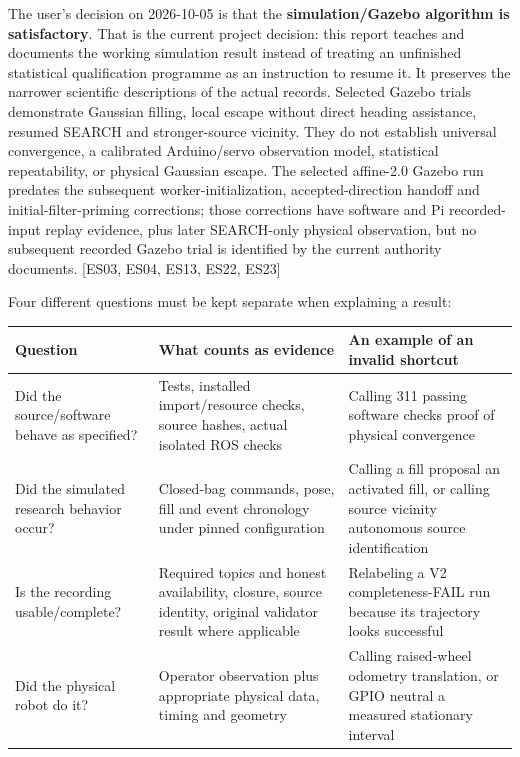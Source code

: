\documentclass[
  10pt,
  letterpaper,
]{article}
\newcounter{none} %
\begin{document}
The user's decision on 2026-10-05 is that the \textbf{simulation/Gazebo
algorithm is satisfactory}. That is the current project decision: this
report teaches and documents the working simulation result instead of
treating an unfinished statistical qualification programme as an
instruction to resume it. It preserves the narrower scientific
descriptions of the actual records. Selected Gazebo trials demonstrate
Gaussian filling, local escape without direct heading assistance,
resumed SEARCH and stronger-source vicinity. They do not establish
universal convergence, a calibrated Arduino/servo observation model,
statistical repeatability, or physical Gaussian escape. The selected
affine-2.0 Gazebo run predates the subsequent worker-initialization,
accepted-direction handoff and initial-filter-priming corrections; those
corrections have software and Pi recorded-input replay evidence, plus
later SEARCH-only physical observation, but no subsequent recorded
Gazebo trial is identified by the current authority documents. {[}ES03,
ES04, ES13, ES22, ES23{]}

Four different questions must be kept separate when explaining a result:

{\def\LTcaptype{none} %
\begin{longtable}[]{@{}
  >{\raggedright\arraybackslash}p{}
  >{\raggedright\arraybackslash}p{}
  >{\raggedright\arraybackslash}p{}@{}}
\toprule\noalign{}
\begin{minipage}[b]{\linewidth}\raggedright
Question
\end{minipage} & \begin{minipage}[b]{\linewidth}\raggedright
What counts as evidence
\end{minipage} & \begin{minipage}[b]{\linewidth}\raggedright
An example of an invalid shortcut
\end{minipage} \\
\midrule\noalign{}
\endhead
\bottomrule\noalign{}
\endlastfoot
Did the source/software behave as specified? & Tests, installed
import/resource checks, source hashes, actual isolated ROS checks &
Calling 311 passing software checks proof of physical convergence \\
Did the simulated research behavior occur? & Closed-bag commands, pose,
fill and event chronology under pinned configuration & Calling a fill
proposal an activated fill, or calling source vicinity autonomous source
identification \\
Is the recording usable/complete? & Required topics and honest
availability, closure, source identity, original validator result where
applicable & Relabeling a V2 completeness-FAIL run because its
trajectory looks successful \\
Did the physical robot do it? & Operator observation plus appropriate
physical data, timing and geometry & Calling raised-wheel odometry
translation, or GPIO neutral a measured stationary interval \\
\end{longtable}
}
\end{document}
